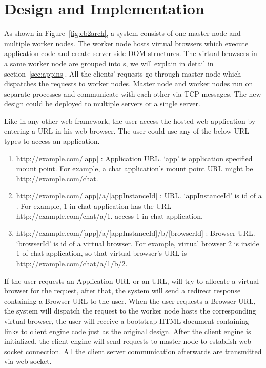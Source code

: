 \section{Design and Implementation}
\label{sec:implementation}
As shown in Figure~\ref{fig:cb2arch}, a \cb{} system consists of one master node and multiple worker nodes.
The worker node hosts virtual browsers which execute application code and create server
side DOM structures.
The virtual browsers in a same worker node are grouped into \appins{}s,
we will explain \appins{} in detail in section~\ref{sec:appins}.
All the clients' requests go through master node which dispatches the requests to
worker nodes.
Master node and worker nodes run on separate processes and communicate with each other
via TCP messages.
The new design could be deployed to multiple servers or a single server.

Like in any other web framework, the user access the hosted web application by entering
a URL in his web browser.
The user could use any of the below URL types to access an application.
\begin{enumerate}
\item \label{itm:appurl} http://example.com/[app] : Application URL.
`app' is application specified mount point. For example, a chat application's mount point URL
might be http://example.com/chat.
\item \label{itm:appinsurl} http://example.com/[app]/a/[appInstanceId] : \appins{} URL.
`appInstanceId' is id of a \appins{}. For example,
\appins{} 1 in chat application has the URL http://example.com/chat/a/1.
access \appins{} 1 in chat application.
\item \label{itm:vburl} http://example.com/[app]/a/[appInstanceId]/b/[browserId] : Browser URL.
`browserId' is id of a virtual browser. For example, virtual browser 2 is inside \appins{} 1 of
chat application, so that virtual browser's URL is http://example.com/chat/a/1/b/2.
\end{enumerate}
If the user requests an Application URL or an \appins{} URL, 
\cb{} will try to allocate a virtual browser for the request,
after that, the system will send a redirect response containing a Browser URL to the user.
When the user requests a Browser URL,
the system will dispatch the request to the worker node hosts the corresponding virtual browser,
the user will receive a bootstrap HTML document containing links to client engine code just as
the original design.
After the client engine is initialized, the client engine will send requests
to master node to establish web socket connection.
All the client server communication afterwards are transmitted via web socket.



